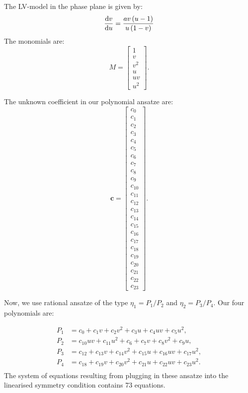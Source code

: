 The LV-model in the phase plane is given by:
\begin{equation}
\dv{v}{u}=\dfrac{a v \left(u - 1\right)}{u \left(1 - v\right)}
\label{eq:LV}
\end{equation}
The monomials are:
\begin{equation}
M=\left[\begin{matrix}1\\v\\v^{2}\\u\\u v\\u^{2}\end{matrix}\right].
\end{equation}

The unknown coefficient in our polynomial ansatze are:
\begin{equation}
\mathbf{c}=\left[\begin{matrix}c_{0}\\c_{1}\\c_{2}\\c_{3}\\c_{4}\\c_{5}\\c_{6}\\c_{7}\\c_{8}\\c_{9}\\c_{10}\\c_{11}\\c_{12}\\c_{13}\\c_{14}\\c_{15}\\c_{16}\\c_{17}\\c_{18}\\c_{19}\\c_{20}\\c_{21}\\c_{22}\\c_{23}\end{matrix}\right].
\end{equation}

Now, we use rational ansatze of the type $\eta_1=P_1/P_2$ and $\eta_2=P_3/P_4$. Our four polynomials are:

\begin{align*}
P_1&=c_{0} + c_{1} v + c_{2} v^{2} + c_{3} u + c_{4} u v + c_{5} u^{2},\\
P_2&=c_{10} u v + c_{11} u^{2} + c_{6} + c_{7} v + c_{8} v^{2} + c_{9} u,\\
P_3&=c_{12} + c_{13} v + c_{14} v^{2} + c_{15} u + c_{16} u v + c_{17} u^{2},\\
P_4&=c_{18} + c_{19} v + c_{20} v^{2} + c_{21} u + c_{22} u v + c_{23} u^{2}.\\
\end{align*}
The system of equations resulting from plugging in these ansatze into the linearised symmetry condition contains 73 equations.
